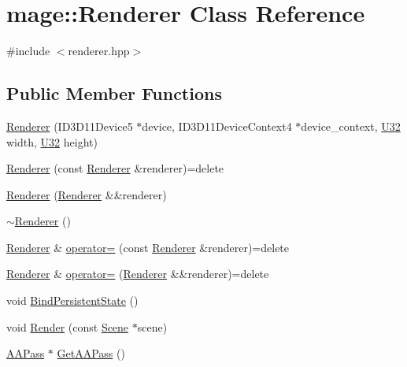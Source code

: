 \hypertarget{classmage_1_1_renderer}{}\section{mage\+:\+:Renderer Class Reference}
\label{classmage_1_1_renderer}


{\ttfamily \#include $<$renderer.\+hpp$>$}

\subsection*{Public Member Functions}
\begin{DoxyCompactItemize}
\item 
\hyperlink{classmage_1_1_renderer_a4efd88a30f3ad43cf5d490d62259f921}{Renderer} (I\+D3\+D11\+Device5 $\ast$device, I\+D3\+D11\+Device\+Context4 $\ast$device\+\_\+context, \hyperlink{namespacemage_a41c104c036fba3756a74e19f793eeaa1}{U32} width, \hyperlink{namespacemage_a41c104c036fba3756a74e19f793eeaa1}{U32} height)
\item 
\hyperlink{classmage_1_1_renderer_acd6b509da2bd7e7d764b45b912fe5298}{Renderer} (const \hyperlink{classmage_1_1_renderer}{Renderer} \&renderer)=delete
\item 
\hyperlink{classmage_1_1_renderer_a24a9346ca7aed427b49d0e4ed4984da3}{Renderer} (\hyperlink{classmage_1_1_renderer}{Renderer} \&\&renderer)
\item 
\hyperlink{classmage_1_1_renderer_a997e041f28cc71d069d1ab7d29fe6ced}{$\sim$\+Renderer} ()
\item 
\hyperlink{classmage_1_1_renderer}{Renderer} \& \hyperlink{classmage_1_1_renderer_a2762ead5f771ae95e4293cd7eb1a2834}{operator=} (const \hyperlink{classmage_1_1_renderer}{Renderer} \&renderer)=delete
\item 
\hyperlink{classmage_1_1_renderer}{Renderer} \& \hyperlink{classmage_1_1_renderer_aa381bb89bffdc8ea2d8e3625e28cd28a}{operator=} (\hyperlink{classmage_1_1_renderer}{Renderer} \&\&renderer)=delete
\item 
void \hyperlink{classmage_1_1_renderer_a0de9d7d913e5f92a75ff2cc075601b9d}{Bind\+Persistent\+State} ()
\item 
void \hyperlink{classmage_1_1_renderer_af18ff4c3d4a9c6d9ec9b30fdb5ad3455}{Render} (const \hyperlink{classmage_1_1_scene}{Scene} $\ast$scene)
\item 
\hyperlink{classmage_1_1_a_a_pass}{A\+A\+Pass} $\ast$ \hyperlink{classmage_1_1_renderer_a52fd71822fe54161ad505a0361ec6c75}{Get\+A\+A\+Pass} ()

\end{DoxyCompactItemize}
